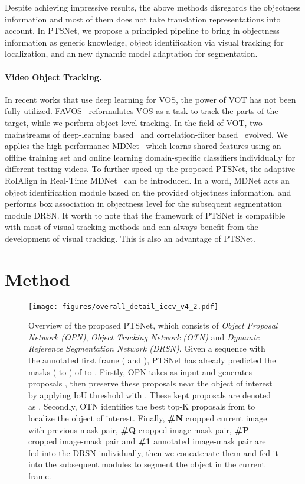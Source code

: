 \documentclass[10pt,twocolumn,letterpaper]{article}
\begin{document}
    Despite achieving impressive results, the above methods disregards the objectness information and most of them does not take translation representations into account. In PTSNet, we propose a principled pipeline to bring in objectness information as generic knowledge, object identification via visual tracking for localization, and an new dynamic model adaptation for segmentation.


    \paragraph{Video Object Tracking.}
    In recent works that use deep learning for VOS, the power of VOT has not been fully utilized. FAVOS~\cite{favos_cvpr18} reformulates VOS as a task to track the parts of the target, while we perform object-level tracking. In the field of VOT, two mainstreams of deep-learning based~\cite{siamfc_eccv16, mdnet_cvpr16, siamrpn_cvpr18, goturn_eccv16} and correlation-filter based~\cite{kcf_pami15, eco_cvpr17, c_cot_eccv16} evolved. We applies the high-performance MDNet~\cite{mdnet_cvpr16} which learns shared features using an offline training set and online learning domain-specific classifiers individually for different testing videos. To further speed up the proposed PTSNet, the adaptive RoIAlign in Real-Time MDNet~\cite{rt_mdnet_eccv18} can be introduced. In a word, MDNet acts an object identification module based on the provided objectness information, and performs box association in objectness level for the subsequent segmentation module DRSN. It worth to note that the framework of PTSNet is compatible with most of visual tracking methods and can always benefit from the development of visual tracking. This is also an advantage of PTSNet.


\section{Method} \label{PTSNet}

    \begin{figure*}
    	\centering
    	\texttt{[image: figures/overall\_detail\_iccv\_v4\_2.pdf]}
    	\caption{Overview of the proposed PTSNet, which consists of \textit{Object Proposal Network (OPN)}, \textit{Object Tracking Network (OTN)} and \textit{Dynamic Reference Segmentation Network (DRSN)}. Given a sequence with the annotated first frame ( and ), PTSNet has already predicted the masks ( to ) of  to . Firstly, OPN takes  as input and generates proposals , then preserve these proposals near the object of interest by applying IoU threshold with . These kept proposals are denoted as . Secondly, OTN identifies the best top-K proposals from  to localize the object of interest. Finally, \textbf{\#N} cropped current image with previous mask pair, \textbf{\#Q} cropped image-mask pair, \textbf{\#P} cropped image-mask pair and \textbf{\#1} annotated image-mask pair are fed into the DRSN individually, then we concatenate them and fed it into the subsequent modules to segment the object in the current frame.}
    	\label{fig:overall_detail}
    \end{figure*}
\end{document}
